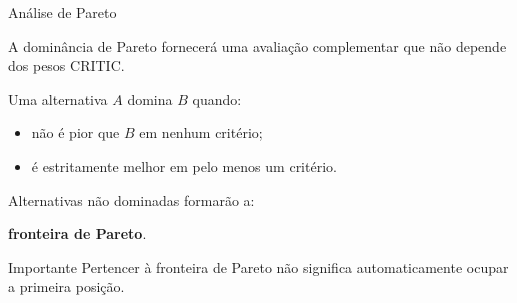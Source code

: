 
\begin{frame}{Análise de Pareto}

    A dominância de Pareto fornecerá uma avaliação complementar que
    não depende dos pesos CRITIC.

    \vspace{0.3cm}

    Uma alternativa \(A\) domina \(B\) quando:

    \begin{itemize}
        \item não é pior que \(B\) em nenhum critério;
        \item é estritamente melhor em pelo menos um critério.
    \end{itemize}

    \vspace{0.3cm}

    Alternativas não dominadas formarão a:

    \begin{center}
        \textbf{fronteira de Pareto}.
    \end{center}

    \vspace{0.2cm}

    \begin{alertblock}{Importante}
        Pertencer à fronteira de Pareto não significa automaticamente
        ocupar a primeira posição.
    \end{alertblock}

\end{frame}



